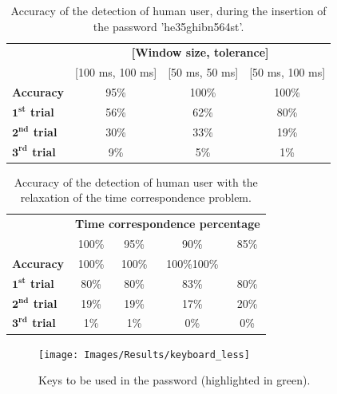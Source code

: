 \begin{table}[H]
\centering\footnotesize
\begin{tabular}{lccc}
\cline{2-4}
&\multicolumn{3}{c}{\textbf{[Window size, tolerance]}}\\
\cline{2-4}
&{[100 ms, 100 ms]}&{[50 ms, 50 ms]}&{[50 ms, 100 ms]}\\
\hline
{\textbf{Accuracy}}&{95\%}&{100\%}&{100\%}\\
\hline
{\textbf{$\mathbf{1^{st}}$ trial}}&{56\%}&{62\%}&{80\%}\\
\hline
{\textbf{$\mathbf{2^{nd}}$ trial}}&{30\%}&{33\%}&{19\%}\\
\hline
{\textbf{$\mathbf{3^{rd}}$ trial}}&{9\%}&{5\%}&{1\%}\\
\hline
\end{tabular}
\caption{\footnotesize{Accuracy of the detection of human user, during the insertion of the password 'he35ghibn564st'.}}
\label{Results:he35ghibn564st}
\end{table}
\begin{table}[H]
\centering\footnotesize
\begin{tabular}{lcccc}
\cline{2-5}
&\multicolumn{4}{c}{\textbf{Time correspondence percentage}}\\
\cline{2-5}
&{100\%}&{95\%}&{90\%}&{85\%}\\
\hline
{\textbf{Accuracy}}&{100\%}&{100\%}&{100\%}{100\%}\\
\hline
{\textbf{$\mathbf{1^{st}}$ trial}}&{80\%}&{80\%}&{83\%}&{80\%}\\
\hline
{\textbf{$\mathbf{2^{nd}}$ trial}}&{19\%}&{19\%}&{17\%}&{20\%}\\
\hline
{\textbf{$\mathbf{3^{rd}}$ trial}}&{1\%}&{1\%}&{0\%}&{0\%}\\
\hline
\end{tabular}
\caption{\footnotesize{Accuracy of the detection of human user with the relaxation of the time correspondence problem.}}
\label{Results:relaxation_time}
\end{table}
\begin{figure}[H]
     \centering
	 \texttt{[image: Images/Results/keyboard\_less]}
     \caption{\footnotesize{Keys to be used in the password (highlighted in green).}}\label{Results:keyboard}
\end{figure}
